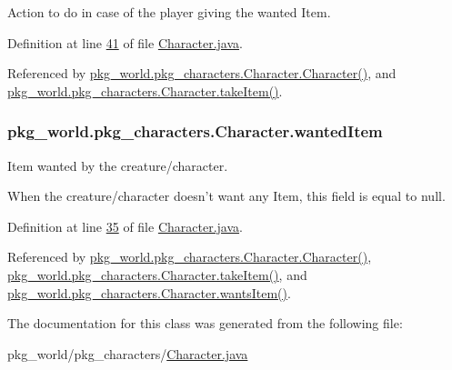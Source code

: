 Action to do in case of the player giving the wanted Item. 



Definition at line \hyperlink{Character_8java_source_l00041}{41} of file \hyperlink{Character_8java_source}{Character.\-java}.



Referenced by \hyperlink{Character_8java_source_l00086}{pkg\-\_\-world.\-pkg\-\_\-characters.\-Character.\-Character()}, and \hyperlink{Character_8java_source_l00113}{pkg\-\_\-world.\-pkg\-\_\-characters.\-Character.\-take\-Item()}.

\hypertarget{classpkg__world_1_1pkg__characters_1_1Character_a3e5abf14759d18446163db9597d10a44}{
\subsubsection[{wanted\-Item}]{ pkg\-\_\-world.\-pkg\-\_\-characters.\-Character.\-wanted\-Item\hspace{0.3cm}{\ttfamily [private]}}}\label{classpkg__world_1_1pkg__characters_1_1Character_a3e5abf14759d18446163db9597d10a44}


Item wanted by the creature/character. 

When the creature/character doesn't want any Item, this field is equal to null. 

Definition at line \hyperlink{Character_8java_source_l00035}{35} of file \hyperlink{Character_8java_source}{Character.\-java}.



Referenced by \hyperlink{Character_8java_source_l00086}{pkg\-\_\-world.\-pkg\-\_\-characters.\-Character.\-Character()}, \hyperlink{Character_8java_source_l00113}{pkg\-\_\-world.\-pkg\-\_\-characters.\-Character.\-take\-Item()}, and \hyperlink{Character_8java_source_l00124}{pkg\-\_\-world.\-pkg\-\_\-characters.\-Character.\-wants\-Item()}.



The documentation for this class was generated from the following file\-:\begin{DoxyCompactItemize}
\item 
pkg\-\_\-world/pkg\-\_\-characters/\hyperlink{Character_8java}{Character.\-java}\end{DoxyCompactItemize}

